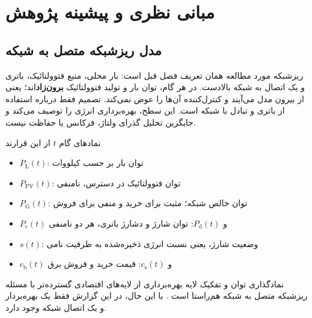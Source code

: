 \chapter{مبانی نظری و پیشینه پژوهش}
\label{chap:background}

\section{مدل ریزشبکه متصل به شبکه}
ریزشبکه مورد مطالعه همان تعریف فصل قبل است: بار محلی، منبع فتوولتائیک، باتری و یک اتصال به شبکه بالادست. در هر گام، توان بار و تولید فتوولتائیک \textbf{برون‌زاد}اند؛ یعنی از بیرون مدل می‌آیند و کنترل‌کننده آن‌ها را عوض نمی‌کند. تصمیم فقط درباره استفاده از باتری و تبادل با شبکه است. این سطح، بهره‌برداری انرژی را توصیف می‌کند و جایگزین تحلیل گذرای ولتاژ، فرکانس یا حفاظت نیست.

نمادهای گام $t$ از این قرارند
\begin{itemize}
  \item $P_{\mathrm{L}}(t)$: توان بار بر حسب کیلووات
  \item $P_{\mathrm{PV}}(t)$: توان فتوولتائیک در دسترس، نامنفی
  \item $P_{\mathrm{G}}(t)$: توان خالص شبکه؛ مثبت برای خرید و منفی برای فروش
  \item $P_{\mathrm{c}}(t)$ و $P_{\mathrm{d}}(t)$: توان شارژ و دشارژ باتری، هر دو نامنفی
  \item $s(t)$: وضعیت شارژ، یعنی نسبت انرژی ذخیره‌شده به ظرفیت نامی
  \item $c_{\mathrm{b}}(t)$ و $c_{\mathrm{s}}(t)$: قیمت خرید و فروش برق
\end{itemize}

نمادگذاری توان و تفکیک لایه بهره‌برداری از لایه‌های اقتصادی گسترده‌تر با مسئله ریزشبکه متصل به شبکه هم‌راستا است . با این حال، در این گزارش فقط یک بهره‌بردار و یک اتصال شبکه وجود دارد.

